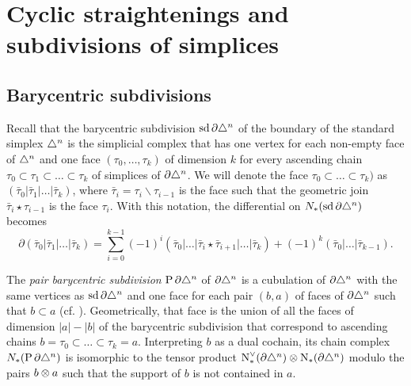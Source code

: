 
\section{Cyclic straightenings and subdivisions of simplices}\label{section:atlast}

\subsection{Barycentric subdivisions}\label{s:assembly}

Recall that the barycentric subdivision $\operatorname{sd} \partial\triangle^n$ of the boundary of the standard simplex $\triangle^n$ is the simplicial complex that has one vertex for each non-empty face of $\triangle^n$ and one face $(\tau_0,\dots,\tau_k)$ of dimension $k$ for every ascending chain $\tau_0 \subset \tau_1\subset\dots \subset \tau_k$ of simplices of $\partial \triangle^n$. We will denote the face $\tau_0 \subset \dots \subset \tau_k)$ as $(\bar{\tau}_0|\bar{\tau}_1|\dots|\bar{\tau}_k)$, where $\bar{\tau}_i = \tau_i\smallsetminus \tau_{i-1}$ is the face such that the geometric join $\bar{\tau}_i\star \tau_{i-1}$ is the face $\tau_i$. With this notation, the differential on $N_{*}(\operatorname{sd} \partial \triangle^n)$ becomes
\[
\partial(\bar{\tau}_0|\bar{\tau}_1|\dots|\bar{\tau}_k) = \sum_{i=0}^{k-1} (-1)^i(\bar{\tau}_0|\dots|\bar{\tau}_i\star \bar{\tau}_{i+1}|\dots |\bar{\tau}_k) + (-1)^k (\bar{\tau}_0|\dots|\bar{\tau}_{k-1}).
\]

The \emph{pair barycentric subdivision} $\operatorname{P} \partial\triangle^n$ of $\partial \triangle^n$ is a cubulation of $\partial \triangle^n$ with the same vertices as $\operatorname{sd} \partial \triangle^n$ and one face for each pair $(b,a)$ of faces of $\partial\triangle^n$ such that $b \subset a$ (cf. \cite{Rounds2010}). Geometrically, that face is the union of all the faces of dimension $|a|-|b|$ of the barycentric subdivision that correspond to ascending chains $b = \tau_0 \subset \dots \subset \tau_k= a$. Interpreting $b$ as a dual cochain, its chain complex $N_{*}(\operatorname{P} \partial\triangle^n)$ is isomorphic to the tensor product $\operatorname{N}^\vee_{*}(\partial\triangle^n) \otimes \operatorname{N}_{*}(\partial\triangle^n)$ modulo the pairs $b \otimes a$ such that the support of $b$ is not contained in $a$.

